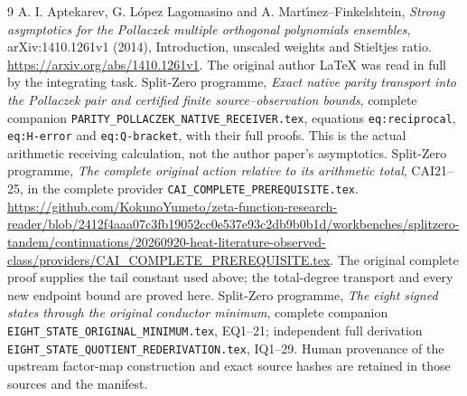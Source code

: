 \documentclass[11pt]{article}
\begin{document}
\begin{thebibliography}{9}
 A. I. Aptekarev, G. L\'opez Lagomasino and
A. Mart\'{\i}nez--Finkelshtein, \emph{Strong asymptotics for the
Pollaczek multiple orthogonal polynomials ensembles},
arXiv:1410.1261v1 (2014), Introduction, unscaled weights and
Stieltjes ratio. \url{https://arxiv.org/abs/1410.1261v1}.
The original author LaTeX was read in full by the integrating task.
 Split-Zero programme, \emph{Exact native parity transport
into the Pollaczek pair and certified finite source--observation bounds},
complete companion \texttt{PARITY\_POLLACZEK\_NATIVE\_RECEIVER.tex},
equations \texttt{eq:reciprocal}, \texttt{eq:H-error} and
\texttt{eq:Q-bracket}, with their full proofs. This is the actual
arithmetic receiving calculation, not the author paper's asymptotics.
 Split-Zero programme, \emph{The complete original action
relative to its arithmetic total}, CAI21--25, in the complete provider
\texttt{CAI\_COMPLETE\_PREREQUISITE.tex}.
\url{https://github.com/KokunoYumeto/zeta-function-research-reader/blob/2412f4aaa07c3fb19052cc0e537e93c2db9b0b1d/workbenches/splitzero-tandem/continuations/20260920-heat-literature-observed-class/providers/CAI_COMPLETE_PREREQUISITE.tex}.
The original complete proof supplies the tail constant used above;
the total-degree transport and every new endpoint bound are proved here.
 Split-Zero programme, \emph{The eight signed states
through the original conductor minimum}, complete companion
\texttt{EIGHT\_STATE\_ORIGINAL\_MINIMUM.tex}, EQ1--21; independent
full derivation \texttt{EIGHT\_STATE\_QUOTIENT\_REDERIVATION.tex},
IQ1--29. Human provenance of the upstream factor-map construction
and exact source hashes are retained in those sources and the manifest.
\end{thebibliography}
\end{document}
